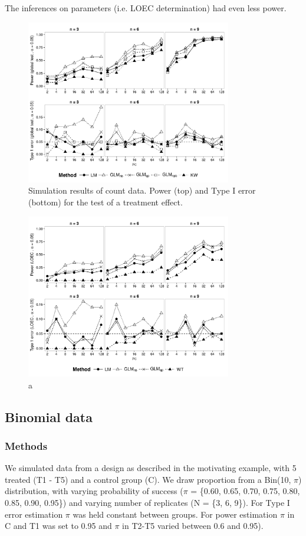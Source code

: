 \documentclass{scrartcl}
\begin{document}
The inferences on parameters (i.e. LOEC determination) had even less power. 

\begin{figure}
  \centering
  \includegraphics[width = 0.8\textwidth]{p_glob_c.pdf}
  \caption{Simulation results of count data. Power (top) and Type I error (bottom) for the test of a treatment effect.}
  \label{fig:p_glob_c}
\end{figure}

\begin{figure}
  \centering
  \includegraphics[width = 0.8\textwidth]{p_loec_c.pdf}
  \caption{a}
  \label{fig:p_loec_c}
\end{figure}



\subsection{Binomial data}
\subsubsection{Methods}
We simulated data from a design as described in the motivating example, with 5 treated (T1 - T5) and a control group (C). 
We draw proportion from a Bin(10, $\pi$) distribution, with varying probability of success ($\pi$ = \{0.60, 0.65, 0.70, 0.75, 0.80, 0.85, 0.90, 0.95\}) and varying number of replicates (N = \{3, 6, 9\}).
For Type I error estimation $\pi$ was held constant between groups.
For power estimation $\pi$ in C and T1 was set to 0.95 and $\pi$ in T2-T5 varied between 0.6 and 0.95).
\end{document}
